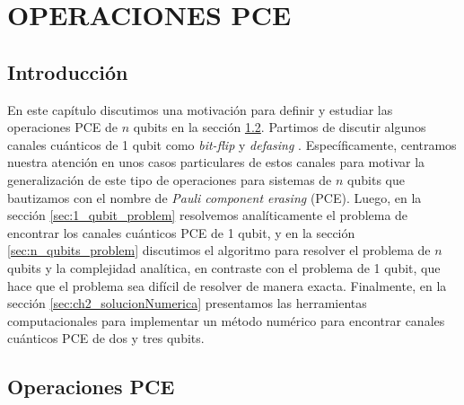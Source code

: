 \chapter{OPERACIONES PCE}

\section{Introducción} %

En este capítulo discutimos 
una motivación para definir y estudiar las operaciones PCE de $n$ qubits en la 
sección \ref{sec:PCE_operations}. Partimos de discutir algunos canales cuánticos 
de 1 qubit como \textit{bit-flip} y \textit{defasing} 
\cite{bengtsson_zyczkowski_2017,nielsen_chuang_2011}. 
Específicamente, centramos nuestra atención en unos casos particulares
de estos canales para motivar la generalización
de este tipo de operaciones para sistemas de $n$ qubits que bautizamos 
con el nombre de \textit{Pauli component erasing} (PCE). 
Luego, en la sección \ref{sec:1_qubit_problem} resolvemos analíticamente 
el problema de encontrar los canales cuánticos PCE de 1 qubit, 
y en la sección \ref{sec:n_qubits_problem} discutimos 
el algoritmo para resolver el problema de $n$ qubits y la complejidad analítica, 
en contraste con el problema de 1 qubit, que hace que el problema sea 
difícil de resolver de manera exacta. Finalmente, en la sección 
\ref{sec:ch2_solucionNumerica} presentamos las herramientas computacionales 
para implementar un método numérico para encontrar canales cuánticos 
PCE de dos y tres qubits.

\section{Operaciones PCE} %
\label{sec:PCE_operations}

